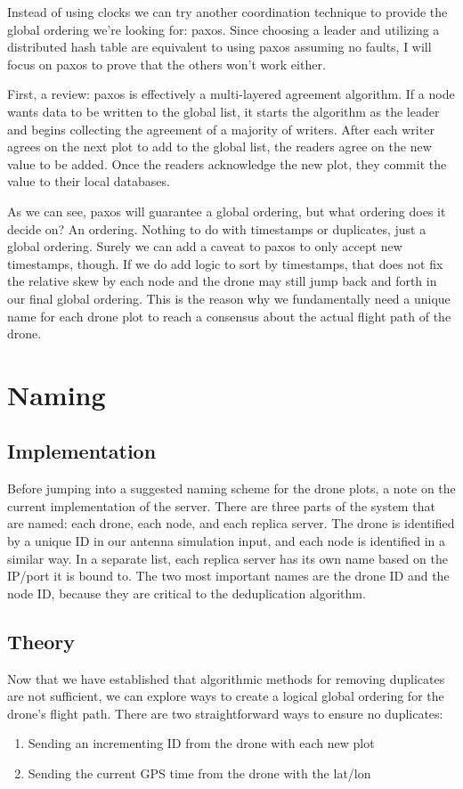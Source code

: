 \documentclass{article}
\begin{document}
\begin{multicols*}{2}
Instead of using clocks we can try another coordination technique to provide the global ordering we're looking for: paxos.  Since choosing a leader and utilizing a distributed hash table are equivalent to using paxos assuming no faults, I will focus on paxos to prove that the others won't work either.

First, a review: paxos is effectively a multi-layered agreement algorithm.  If a node wants data to be written to the global list, it starts the algorithm as the leader and begins collecting the agreement of a majority of writers.  After each writer agrees on the next plot to add to the global list, the readers agree on the new value to be added.  Once the readers acknowledge the new plot, they commit the value to their local databases.

As we can see, paxos will guarantee a global ordering, but what ordering does it decide on?  An ordering.  Nothing to do with timestamps or duplicates, just a global ordering.  Surely we can add a caveat to paxos to only accept new timestamps, though.  If we do add logic to sort by timestamps, that does not fix the relative skew by each node and the drone may still jump back and forth in our final global ordering.  This is the reason why we fundamentally need a unique name for each drone plot to reach a consensus about the actual flight path of the drone.

\section{Naming}
\subsection{Implementation}
Before jumping into a suggested naming scheme for the drone plots, a note on the current implementation of the server.  There are three parts of the system that are named: each drone, each node, and each replica server.  The drone is identified by a unique ID in our antenna simulation input, and each node is identified in a similar way.  In a separate list, each replica server has its own name based on the IP/port it is bound to.  The two most important names are the drone ID and the node ID, because they are critical to the deduplication algorithm.

\subsection{Theory}
Now that we have established that algorithmic methods for removing duplicates are not sufficient, we can explore ways to create a logical global ordering for the drone's flight path.  There are two straightforward ways to ensure no duplicates:
\begin{enumerate}
	\item Sending an incrementing ID from the drone with each new plot
	\item Sending the current GPS time from the drone with the lat/lon
\end{enumerate}


\end{multicols*}
\end{document}
